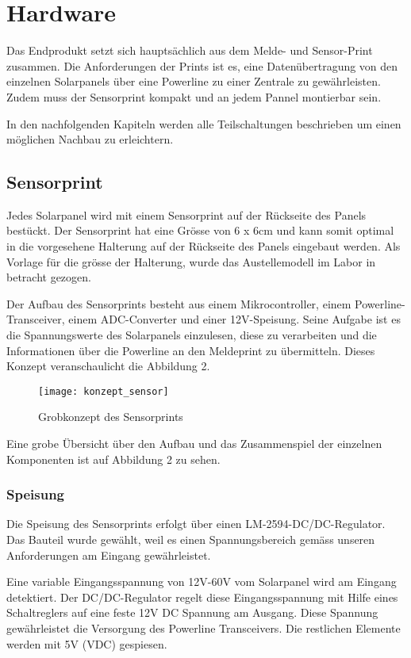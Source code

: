 \section{Hardware}
Das Endprodukt setzt sich hauptsächlich aus dem Melde- und Sensor-Print zusammen. Die Anforderungen der Prints ist es, eine Datenübertragung von den einzelnen Solarpanels über eine Powerline zu einer Zentrale zu gewährleisten. Zudem muss der Sensorprint kompakt und an jedem Pannel montierbar sein.

In den nachfolgenden Kapiteln werden alle Teilschaltungen beschrieben um einen möglichen Nachbau zu erleichtern.

\subsection{Sensorprint}


Jedes Solarpanel wird mit einem Sensorprint auf der Rückseite des Panels bestückt. Der Sensorprint hat eine Grösse von 6 x 6cm und kann somit optimal in die vorgesehene Halterung auf der Rückseite des Panels eingebaut werden. Als Vorlage für die grösse der Halterung, wurde das Austellemodell im Labor in betracht gezogen.

Der Aufbau des Sensorprints besteht aus einem Mikrocontroller, einem Powerline-Transceiver, einem ADC-Converter und einer 12V-Speisung. Seine Aufgabe ist es die Spannungswerte des Solarpanels einzulesen, diese zu verarbeiten und die Informationen über die Powerline an den Meldeprint zu übermitteln. Dieses Konzept veranschaulicht die Abbildung 2.

\begin{figure}[h]
\centering
\texttt{[image: konzept\_sensor]}
\caption{Grobkonzept des Sensorprints}
\end{figure}

Eine grobe Übersicht über den Aufbau und das Zusammenspiel der einzelnen Komponenten ist auf Abbildung 2 zu sehen.



\subsubsection{Speisung}
Die Speisung des Sensorprints erfolgt über einen LM-2594-DC/DC-Regulator. Das Bauteil wurde gewählt, weil es einen Spannungsbereich gemäss unseren Anforderungen am Eingang gewährleistet.

Eine variable Eingangsspannung von 12V-60V vom Solarpanel wird am Eingang detektiert. Der DC/DC-Regulator regelt diese Eingangsspannung mit Hilfe eines Schaltreglers auf eine feste 12V DC Spannung am Ausgang. Diese Spannung gewährleistet die Versorgung des Powerline Transceivers. Die restlichen Elemente werden mit 5V (VDC) gespiesen.

